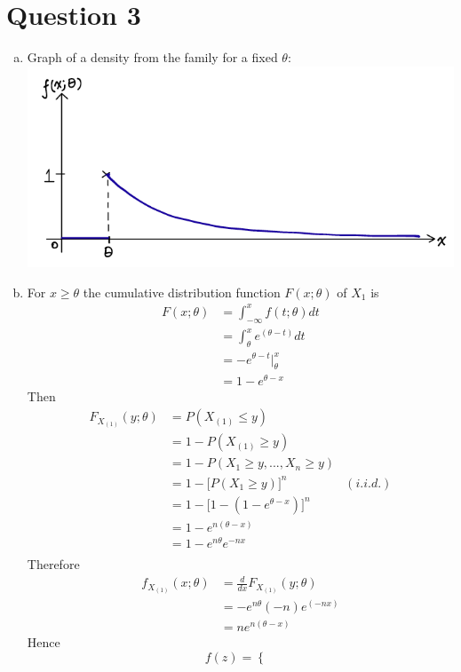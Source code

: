 \documentclass[a4paper,11pt]{article}
\begin{document}
\section{Question 3}
\begin{enumerate}[(a)]
	\item Graph of a density from the family for a fixed $\theta$: \\
		\includegraphics[scale=0.5]{3a.png}
	\item 
		For $x\ge \theta$ the cumulative distribution function $F(x;\theta) $ of $X_{1}$ is
		\begin{align*}
		F(x;\theta) &= \int^x_{-\infty} f(t;\theta) dt \\
		&=\int^x_{\theta} e^{(\theta-t)} dt \\
		&= -e^{\theta-t}\bigg |^x_\theta \\
		&=1-e^{\theta-x}
		\end{align*}
		Then
		\begin{align*}
		F_{X_{(1)}}(y;\theta) &= P(X_{(1)}\le y)\\
		&= 1 - P(X_{(1)}\ge y)\\
		&= 1 - P(X_1 \ge y, ... , X_n \ge y)\\
		&= 1 - \bigg[P(X_1 \ge y) \bigg]^n &  (i.i.d.)\\
		&= 1 - \bigg[ 1 - (1-e^{\theta-x}) \bigg]^n\\
		&= 1 - e^{n(\theta-x)}\\
		&= 1- e^{n\theta}e^{-nx}\\
		\end{align*}
		Therefore
		\begin{align*}
		f_{X_{(1)}}(x;\theta) &= \frac{d}{dx}F_{X_{(1)}}(y;\theta) \\
		&= -e^{n\theta}(-n)e^(-nx)\\
		&= ne^{n(\theta-x)}
		\end{align*}
		Hence
		\[
		f(z) = \left\{ 
			\begin{array}{rcl}

\end{array}\]
\end{enumerate}
\end{document}
